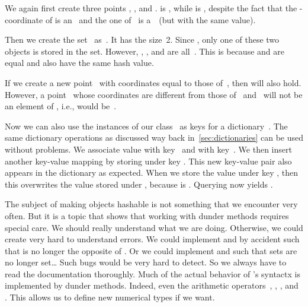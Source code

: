 We again first create three points , , and .
 is , while  is , despite the fact that the \nobreakdashes-coordinate of  is an~ and the one of~ is a~~(but with the same value).

Then we create the set~ as~.
It has the size~2.
Since , only one of these two objects is stored in the set.
However, , , and  are all~.
This is because  and  are equal and also have the same hash value.

If we create a new point~ with coordinates equal to those of~, then  will also hold.
However, a point~ whose coordinates are different from those of~ and~ will not be an element of , i.e.,  would be~.

Now we can also use the instances of our class~ as keys for a dictionary~.
The same dictionary operations as discussed way back in~\cref{sec:dictionaries} can be used without problems.
We associate value  with key~ and  with key~.
We then insert another key-value mapping by storing  under key .
This new key-value pair also appears in the dictionary as expected.
When we store the value  under key , then this overwrites the value  stored under , because  is .
Querying  now yields .

The subject of making objects hashable is not something that we encounter very often.
But it is a topic that shows that working with dunder methods requires special care.
We should really understand what we are doing.
Otherwise, we could create very hard to understand errors.
We could implement  and   by accident such that   is no longer the opposite of .
Or we could implement  and  such that sets are no longer set{\dots}
Such bugs would be very hard to detect.
So we always have to read the documentation thoroughly.%
%
\FloatBarrier%
\endhsection%
%
%
\label{sec:arithmeticsAndOrder}%
%
%
%
%
\afterpage{\clearpage}%
%
Much of the actual behavior of \python's syntactx is implemented by dunder methods.
Indeed, even the arithmetic operators~\pythonilIdx{+}, \pythonilIdx{-}, \pythonilIdx{*}, and \pythonilIdx{/}.
This allows us to define new numerical types if we want.

